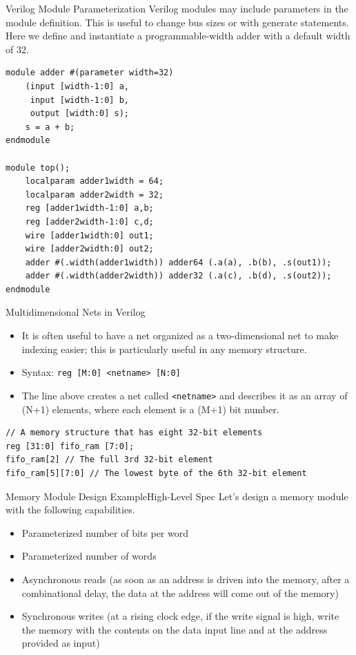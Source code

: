 \documentclass{beamer}
\begin{document}
\begin{frame}[fragile]{Verilog Module Parameterization}
	Verilog modules may include parameters in the module definition.
	This is useful to change bus sizes or with generate statements.
	Here we define and instantiate a programmable-width adder with a default width of 32.

\begin{verbatim}
module adder #(parameter width=32)
	(input [width-1:0] a,
	 input [width-1:0] b,
	 output [width:0] s);
	s = a + b;
endmodule

module top();
	localparam adder1width = 64;
	localparam adder2width = 32;
	reg [adder1width-1:0] a,b;
	reg [adder2width-1:0] c,d;
	wire [adder1width:0] out1;
	wire [adder2width:0] out2;
	adder #(.width(adder1width)) adder64 (.a(a), .b(b), .s(out1));
	adder #(.width(adder2width)) adder32 (.a(c), .b(d), .s(out2));
endmodule
\end{verbatim}

\end{frame}

\begin{frame}[fragile]{Multidimensional Nets in Verilog}
	\begin{itemize}
		\item It is often useful to have a net organized as a two-dimensional net to make indexing easier; this is particularly useful in any memory structure.
		\item Syntax: \texttt{reg [M:0] <netname> [N:0]}
		\item The line above creates a net called \texttt{<netname>} and describes it as an array of (N+1) elements, where each element is a (M+1) bit number.
	\end{itemize}

\begin{verbatim}
// A memory structure that has eight 32-bit elements
reg [31:0] fifo_ram [7:0];
fifo_ram[2] // The full 3rd 32-bit element
fifo_ram[5][7:0] // The lowest byte of the 6th 32-bit element
\end{verbatim}
\end{frame}

\begin{frame}{Memory Module Design Example}{High-Level Spec}
	Let's design a memory module with the following capabilities.
	\begin{itemize}
		\item Parameterized number of bits per word
		\item Parameterized number of words
		\item Asynchronous reads (as soon as an address is driven into the memory, after a combinational delay, the data at the address will come out of the memory)
		\item Synchronous writes (at a rising clock edge, if the write signal is high, write the memory with the contents on the data input line and at the address provided as input)
	\end{itemize}
\end{frame}
\end{document}
